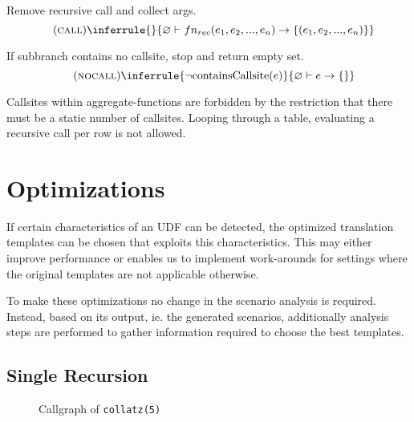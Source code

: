 Remove recursive call and collect args.
$$\quad(\textsc{call})\inferrule{
}{
    \varnothing \vdash fn_{rec}(e_1, e_2, ..., e_n) \rightarrow \{ (e_1, e_2, ..., e_n) \}
}$$

If subbranch contains no callsite, stop and return empty set.
$$\quad(\textsc{nocall})\inferrule{
\neg \text{containsCallsite}(e)
}{  
    \varnothing \vdash e \rightarrow \{\}
}$$

Callsites within aggregate-functions are forbidden by the restriction that there must be a static number of callsites. Looping through a table, evaluating a recursive call per row is not allowed.





\chapter{Optimizations}

If certain characteristics of an UDF can be detected, the optimized translation templates can be chosen that exploits this characteristics. This may either improve performance or enables us to implement work-arounds for settings where the original templates are not applicable otherwise.

To make these optimizations no change in the scenario analysis is required. Instead, based on its output, ie. the generated scenarios, additionally analysis steps are performed to gather information required to choose the best templates.



\section{Single Recursion}

\begin{wrapfigure}{r}{0.2\textwidth}
  \vspace{-20pt}\centering
{}
  \vspace{-10pt}
  \caption{Callgraph of \texttt{collatz(5)}}
  \label{tr_callgraph}
\end{wrapfigure}

